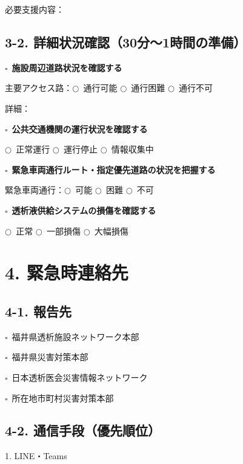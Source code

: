 \documentclass[a4paper,12pt]{jarticle}
\newcommand{\checkbox}{$\square$\ }
\newcommand{\underlinespace}[1]{\underline{\hspace{#1}}}
\newcommand{\circlecheck}{$\bigcirc$\ }
\begin{document}
\quad 必要支援内容：\underlinespace{10cm}

\vspace{5mm}

\subsection*{3-2. 詳細状況確認（30分～1時間の準備）}

\checkbox \textbf{施設周辺道路状況を確認する}

\quad 主要アクセス路：\circlecheck 通行可能 \circlecheck 通行困難 \circlecheck 通行不可

\quad 詳細：\underlinespace{10cm}

\vspace{3mm}

\checkbox \textbf{公共交通機関の運行状況を確認する}

\quad \circlecheck 正常運行 \quad \circlecheck 運行停止 \quad \circlecheck 情報収集中

\vspace{3mm}

\checkbox \textbf{緊急車両通行ルート・指定優先道路の状況を把握する}

\quad 緊急車両通行：\circlecheck 可能 \circlecheck 困難 \circlecheck 不可

\vspace{3mm}

\checkbox \textbf{透析液供給システムの損傷を確認する}

\quad \circlecheck 正常 \quad \circlecheck 一部損傷 \quad \circlecheck 大幅損傷

\vspace{5mm}

\section*{4. 緊急時連絡先}

\subsection*{4-1. 報告先}
\checkbox 福井県透析施設ネットワーク本部

\checkbox 福井県災害対策本部

\checkbox 日本透析医会災害情報ネットワーク

\checkbox 所在地市町村災害対策本部

\subsection*{4-2. 通信手段（優先順位）}
1. LINE・Teams
\end{document}
